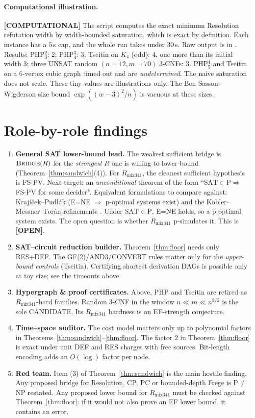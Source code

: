 \documentclass[11pt]{article}
\theoremstyle{remark}
\newcommand{\SAT}{\mathrm{SAT}}
\newcommand{\status}[1]{\textbf{[#1]}}
\newcommand{\Rmix}{R_{\mathrm{mix341}}}
\begin{document}
\paragraph{Computational illustration.} \status{COMPUTATIONAL} The script
 computes the exact minimum
Resolution refutation width by width-bounded saturation, which is exact by definition. Each
instance has a 5\,s cap, and the whole run takes under 30\,s. Raw output is in
. Results: PHP$^2_3$: 2; PHP$^3_4$: 3; Tseitin on $K_4$ (odd): 4,
one more than its initial width 3; three UNSAT random $(n=12,m=70)$ 3-CNFs: 3. PHP$^4_5$ and
Tseitin on a 6-vertex cubic graph timed out and are \emph{undetermined}. The naive saturation does
not scale. These tiny values are illustrations only. The Ben-Sasson--Wigderson size bound
$\exp((w-3)^2/n)$ is vacuous at these sizes.

\section{Role-by-role findings}
\begin{enumerate}
\item \textbf{General SAT lower-bound lead.} The weakest sufficient bridge is $\textsc{Bridge}(R)$ for
the \emph{strongest} $R$ one is willing to lower-bound (Theorem~\ref{thm:sandwich}(4)). For
$\Rmix$, the cleanest sufficient hypothesis is FS-PV. Next target: an \emph{unconditional} theorem
of the form ``$\SAT\in\mathrm P\Rightarrow$ FS-PV for some decider''. Equivalent formulations to
compare against: Krajíček--Pudlák (E=NE $\Rightarrow$ p-optimal systems exist) and the
Köbler--Messner--Torán refinements \cite{kp1989,kmt2003}. Under $\SAT\in\mathrm P$, E=NE holds, so
a p-optimal system exists. The open question is whether $\Rmix$ p-simulates it. This is
\status{OPEN}.
\item \textbf{SAT--circuit reduction builder.} Theorem~\ref{thm:floor} needs only RES+DEF. The
GF(2)/AND3/CONVERT rules matter only for the \emph{upper-bound controls} (Tseitin). Certifying
shortest derivation DAGs is possible only at toy size; see the timeouts above.
\item \textbf{Hypergraph \& proof certificates.} Above, PHP and Tseitin are retired as $\Rmix$-hard
families. Random 3-CNF in the window $n\ll m\ll n^{3/2}$ is the sole CANDIDATE. Its $\Rmix$ hardness
is an EF-strength conjecture.
\item \textbf{Time--space auditor.} The cost model matters only up to polynomial factors in
Theorems~\ref{thm:sandwich}--\ref{thm:floor}. The factor $2$ in Theorem~\ref{thm:floor} is exact
under unit DEF and RES charges with free sources. Bit-length encoding adds an
$O(\log)$ factor per node.
\item \textbf{Red team.} Item (3) of Theorem~\ref{thm:sandwich} is the main hostile finding. Any
proposed bridge for Resolution, CP, PC or bounded-depth Frege is P$\ne$NP restated. Any proposed
lower bound for $\Rmix$ must be checked against Theorem~\ref{thm:floor}: if it would not also
prove an EF lower bound, it contains an error.
\end{enumerate}
\end{document}
